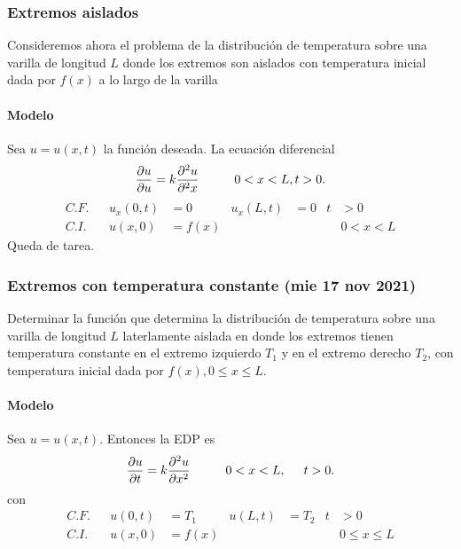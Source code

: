 \documentclass[11pt,letterpaper,draft]{report}
\newcommand\<{\langle}
\renewcommand\>{\rangle}
\begin{document}
\subsubsection{Extremos aislados}
Consideremos ahora el problema de la distribución de temperatura
sobre una varilla de longitud $L$ donde los extremos son aislados
con temperatura inicial dada por $f(x)$ a lo largo de la varilla

\paragraph{Modelo}
Sea $u=u(x,t)$ la función deseada. La ecuación diferencial
\[
  \frac{\partial u}{\partial u}
  =k
  \frac{\partial^2u}{\partial^2x}
  \hspace{10mm} 0<x<L, t>0
.\]
\begin{align*}
  C.F. && u_x(0,t) &= 0 & u_x(L,t) &= 0 &t&>0 \\
  C.I. && u(x,0) &= f(x) & &&& 0<x<L
\end{align*}
Queda de tarea.

\subsubsection{Extremos con temperatura constante (mie 17 nov
2021)}

Determinar la función que determina la distribución de
temperatura sobre una varilla de longitud $L$ laterlamente
aislada en donde los extremos tienen temperatura constante en el
extremo izquierdo $T_1$ y en el extremo derecho $T_2$, con
temperatura inicial dada por $f(x), 0\leq x\leq L$.

\paragraph{Modelo}
Sea $u=u(x,t)$. Entonces la EDP es
\[
  \frac{\partial u}{\partial t}
  = k
  \frac{\partial ^2 u}{\partial x^2}
  \hspace{10mm} 0<x<L,
  \hspace{5mm} t>0.
\]
con
\begin{align*}
  C.F. && u(0,t) &= T_1 & u(L,t) &= T_2 &t&>0 \\
  C.I. && u(x,0) &= f(x) & &&& 0\leq x\leq L
\end{align*}
\end{document}
